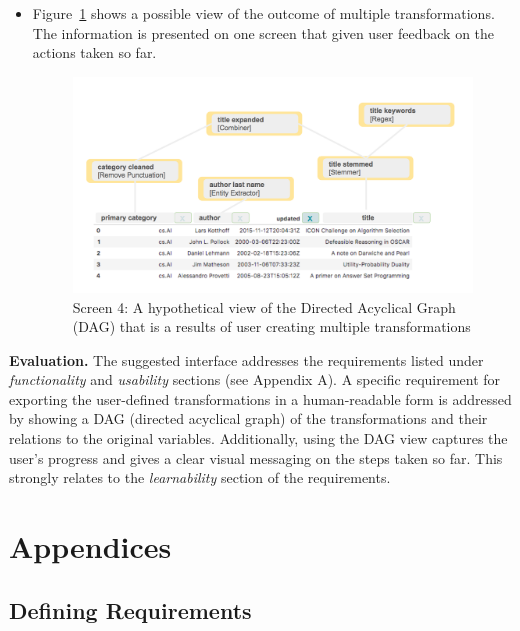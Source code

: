 \documentclass[12pt,letterpaper]{article}
\begin{document}
\begin{itemize}
    \item Figure~\ref{fig::5} shows a possible view of the outcome of multiple transformations. The information is presented on one screen that given user feedback on the actions taken so far.

\begin{figure}[h]
\centering
\includegraphics[scale=.3]{figures/m3/wireframe-screen5.png}
\caption{Screen 4: A hypothetical view of the Directed Acyclical Graph (DAG) that is a results of user creating multiple transformations}
\label{fig::5}
\end{figure}

\end{itemize}

\textbf{Evaluation.} The suggested interface addresses the requirements listed under \textit{functionality} and \textit{usability} sections (see Appendix A). A specific requirement for exporting the user-defined transformations in a human-readable form is addressed by showing a DAG (directed acyclical graph) of the transformations and their relations to the original variables.  Additionally, using the DAG view captures the user's progress and gives a clear visual messaging on the steps taken so far. This strongly relates to the \textit{learnability} section of the requirements.  


 


\newpage
\section*{Appendices}

\appendix

\subsection*{Defining Requirements}
\end{document}
